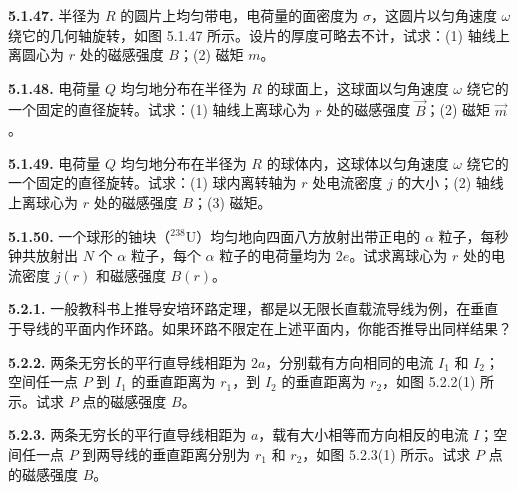 \vfill
\newpage

\textbf{5.1.47.} 半径为 $R$ 的圆片上均匀带电，电荷量的面密度为 $\sigma$，这圆片以匀角速度 $\omega$ 绕它的几何轴旋转，如图 5.1.47 所示。设片的厚度可略去不计，试求：(1) 轴线上离圆心为 $r$ 处的磁感强度 $B$；(2) 磁矩 $m$。

\begin{center}
\end{center}

\vfill
\newpage

\textbf{5.1.48.} 电荷量 $Q$ 均匀地分布在半径为 $R$ 的球面上，这球面以匀角速度 $\omega$ 绕它的一个固定的直径旋转。试求：(1) 轴线上离球心为 $r$ 处的磁感强度 $\vec{B}$；(2) 磁矩 $\vec{m}$。

\vfill
\newpage

\textbf{5.1.49.} 电荷量 $Q$ 均匀地分布在半径为 $R$ 的球体内，这球体以匀角速度 $\omega$ 绕它的一个固定的直径旋转。试求：(1) 球内离转轴为 $r$ 处电流密度 $j$ 的大小；(2) 轴线上离球心为 $r$ 处的磁感强度 $B$；(3) 磁矩。

\vfill
\newpage

\textbf{5.1.50.} 一个球形的铀块（$^{238}\mathrm{U}$）均匀地向四面八方放射出带正电的 $\alpha$ 粒子，每秒钟共放射出 $N$ 个 $\alpha$ 粒子，每个 $\alpha$ 粒子的电荷量均为 $2e$。试求离球心为 $r$ 处的电流密度 $j(r)$ 和磁感强度 $B(r)$。

\vfill
\newpage

\textbf{5.2.1.} 一般教科书上推导安培环路定理，都是以无限长直载流导线为例，在垂直于导线的平面内作环路。如果环路不限定在上述平面内，你能否推导出同样结果？

\vfill
\newpage

\textbf{5.2.2.} 两条无穷长的平行直导线相距为 $2a$，分别载有方向相同的电流 $I_{1}$ 和 $I_{2}$；空间任一点 $P$ 到 $I_{1}$ 的垂直距离为 $r_{1}$，到 $I_{2}$ 的垂直距离为 $r_{2}$，如图 5.2.2(1) 所示。试求 $P$ 点的磁感强度 $B$。

\begin{center}
\end{center}

\vfill
\newpage

\textbf{5.2.3.} 两条无穷长的平行直导线相距为 $a$，载有大小相等而方向相反的电流 $I$；空间任一点 $P$ 到两导线的垂直距离分别为 $r_{1}$ 和 $r_{2}$，如图 5.2.3(1) 所示。试求 $P$ 点的磁感强度 $B$。

\begin{center}
\end{center}

